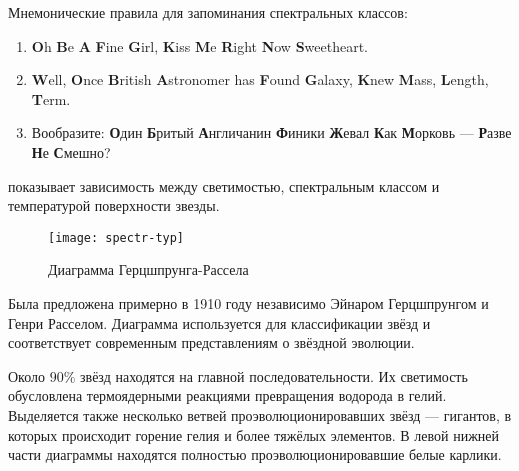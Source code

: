 Мнемонические правила для запоминания спектральных классов:
\begin{enumerate}[1)]
\item\textbf{O}h \textbf{B}e \textbf{A} \textbf{F}ine \textbf{G}irl, \textbf{K}iss \textbf{M}e \textbf{R}ight \textbf{N}ow \textbf{S}weetheart.
\item\textbf{W}ell, \textbf{O}nce \textbf{B}ritish \textbf{A}stronomer has \textbf{F}ound \textbf{G}alaxy, \textbf{K}new \textbf{M}ass, \textbf{L}ength, \textbf{T}erm.
\item Вообразите: \textbf{О}дин \textbf{Б}ритый \textbf{А}нгличанин \textbf{Ф}иники \textbf{Ж}евал \textbf{К}ак \textbf{М}орковь --- \textbf{Р}азве \textbf{Н}е \textbf{С}мешно?
\end{enumerate}

 показывает зависимость между светимостью, спектральным классом и температурой поверхности звезды. 

\begin{figure}[h!]
\centering
\texttt{[image: spectr-typ]}
\caption{Диаграмма Герцшпрунга-Рассела}
\end{figure}

Была предложена примерно в 1910 году независимо Эйнаром Герцшпрунгом и Генри Расселом. Диаграмма используется для классификации звёзд и соответствует современным представлениям о звёздной эволюции.

Около $90 \%$ звёзд находятся на главной последовательности. Их светимость обусловлена термоядерными реакциями превращения водорода в гелий. Выделяется также несколько ветвей проэволюционировавших звёзд --- гигантов, в которых происходит горение гелия и более тяжёлых элементов. В левой нижней части диаграммы находятся полностью проэволюционировавшие белые карлики.

